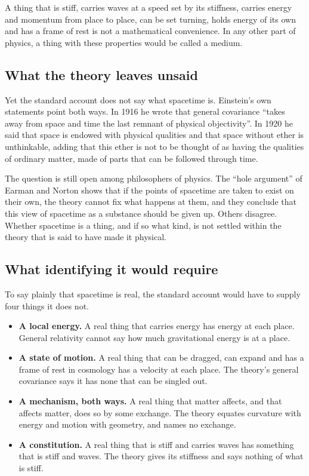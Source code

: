 \documentclass[11pt,a4paper]{article}
\begin{document}
 A thing that is stiff, carries waves at a speed set by its stiffness, carries energy and momentum from place to place, can be set turning, holds energy of its own and has a frame of rest is not a mathematical convenience. In any other part of physics, a thing with these properties would be called a medium.

\subsection{What the theory leaves unsaid}

Yet the standard account does not say what spacetime is. Einstein's own statements point both ways. In 1916 he wrote that general covariance ``takes away from space and time the last remnant of physical objectivity''. In 1920 he said that space is endowed with physical qualities and that space without ether is unthinkable, adding that this ether is not to be thought of as having the qualities of ordinary matter, made of parts that can be followed through time.

The question is still open among philosophers of physics. The ``hole argument'' of Earman and Norton shows that if the points of spacetime are taken to exist on their own, the theory cannot fix what happens at them, and they conclude that this view of spacetime as a substance should be given up. Others disagree. Whether spacetime is a thing, and if so what kind, is not settled within the theory that is said to have made it physical.

\subsection{What identifying it would require}

To say plainly that spacetime is real, the standard account would have to supply four things it does not.
\begin{itemize}
\item \textbf{A local energy.} A real thing that carries energy has energy at each place. General relativity cannot say how much gravitational energy is at a place.
\item \textbf{A state of motion.} A real thing that can be dragged, can expand and has a frame of rest in cosmology has a velocity at each place. The theory's general covariance says it has none that can be singled out.
\item \textbf{A mechanism, both ways.} A real thing that matter affects, and that affects matter, does so by some exchange. The theory equates curvature with energy and motion with geometry, and names no exchange.
\item \textbf{A constitution.} A real thing that is stiff and carries waves has something that is stiff and waves. The theory gives its stiffness and says nothing of what is stiff.
\end{itemize}
\end{document}
